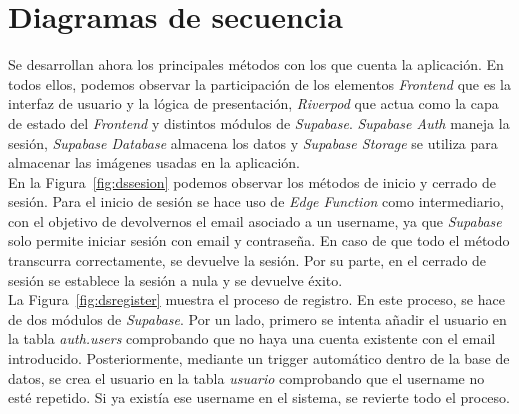 \section{Diagramas de secuencia}

Se desarrollan ahora los principales métodos con los que cuenta la aplicación. En todos ellos, podemos observar la participación de los elementos \textit{Frontend} que es la interfaz de usuario y la lógica de presentación, \textit{Riverpod} que actua como la capa de estado del \textit{Frontend} y distintos módulos de \textit{Supabase}. \textit{Supabase Auth} maneja la sesión, \textit{Supabase Database} almacena los datos y \textit{Supabase Storage} se utiliza para almacenar las imágenes usadas en la aplicación.  \\

En la Figura~\ref{fig:dssesion} podemos observar los métodos de inicio y cerrado de sesión. Para el inicio de sesión se hace uso de \textit{Edge Function} como intermediario, con el objetivo de devolvernos el email asociado a un username, ya que \textit{Supabase} solo permite iniciar sesión con email y contraseña. En caso de que todo el método transcurra correctamente, se devuelve la sesión. Por su parte, en el cerrado de sesión se establece la sesión a nula y se devuelve éxito. \\

La Figura~\ref{fig:dsregister} muestra el proceso de registro. En este proceso, se hace de dos módulos de \textit{Supabase}. Por un lado, primero se intenta añadir el usuario en la tabla \textit{auth.users} comprobando que no haya una cuenta existente con el email introducido. Posteriormente, mediante un trigger automático dentro de la base de datos, se crea el usuario en la tabla \textit{usuario} comprobando que el username no esté repetido. Si ya existía ese username en el sistema, se revierte todo el proceso. \\

